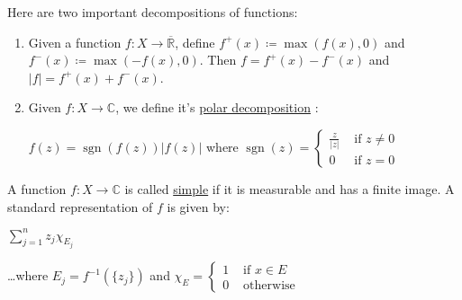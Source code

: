 \documentclass{book}
\newcommand{\udefine}[1]{{%
   \setulcolor{Red}%
   \setul{0.14em}{0.07em}%
   \ul{#1}%
}}
\DeclareMathOperator{\sgn}{sgn}
\newcommand{\retTwo}{\hfill\bigbreak}
\begin{document}
Here are two important decompositions of functions:
\begin{enumerate}
   \item Given a function $f: X \longrightarrow \overline{\mathbb{R}}$, define $f^+(x) \coloneq \max(f(x), 0)$ and\\ $f^-(x) \coloneq \max(-f(x), 0)$. Then $f = f^+(x) - f^-(x)$ and\\ $|f| = f^+(x) + f^-(x)$.\newpage
   \item Given $f: X \longrightarrow \mathbb{C}$, we define it's \udefine{polar decomposition}:
   
   {\centering $f(z) = \sgn(f(z))|f(z)|$ where $\sgn(z) = \left\{
   \begin{matrix}
      \frac{z}{|z|} & \text{ if } z \neq 0 \\ 0 & \text{ if } z = 0
   \end{matrix}\right.$ \retTwo\par}
\end{enumerate}

A function $f: X \longrightarrow \mathbb{C}$ is called \udefine{simple} if it is measurable and has a finite image. A standard representation of $f$ is given by:

{\centering $\sum\limits_{j=1}^n z_j \chi_{E_j}$ \retTwo\par}

\dots where $E_j = f^{-1}(\{z_j\})$ and $\chi_E = \left\{
\begin{matrix}
   1 & \text{ if } x \in E\\
   0 & \text{ otherwise }
\end{matrix}\right.$\retTwo
\end{document}
